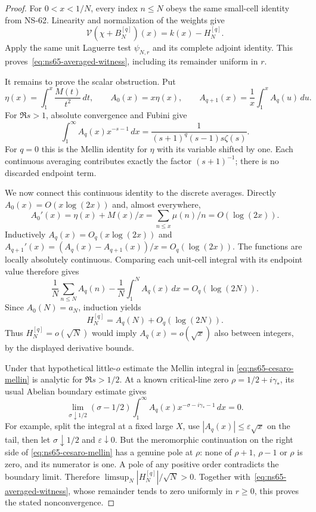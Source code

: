\documentclass[11pt]{article}
\theoremstyle{remark}
\begin{document}
\begin{proof}
For $0<x<1/N$, every index $n\leq N$ obeys the same small-cell
identity from NS-62. Linearity and normalization of the weights give
\[
 \mathcal V(\chi+B_N^{[q]})(x)=k(x)-H_N^{[q]}.
\]
Apply the same unit Laguerre test $\psi_{N,r}$ and its complete
adjoint identity. This proves~\eqref{eq:ns65-averaged-witness},
including its remainder uniform in $r$.

It remains to prove the scalar obstruction. Put
\[
 \eta(x)=\int_1^x\frac{M(t)}{t^2}\,dt,\qquad
 A_0(x)=x\eta(x),\qquad
 A_{q+1}(x)=\frac1x\int_1^x A_q(u)\,du.
\]
For $\Re s>1$, absolute convergence and Fubini give
\begin{equation}
 \int_1^\infty A_q(x)x^{-s-1}\,dx
   =\frac1{(s+1)^q(s-1)s\zeta(s)}.
 \label{eq:ns65-cesaro-mellin}
\end{equation}
For $q=0$ this is the Mellin identity for $\eta$ with its variable
shifted by one. Each continuous averaging contributes exactly the
factor $(s+1)^{-1}$; there is no discarded endpoint term.

We now connect this continuous identity to the discrete averages.
Directly $A_0(x)=O(x\log(2x))$ and, almost everywhere,
\[
 A_0'(x)=\eta(x)+M(x)/x
         =\sum_{n\leq x}\mu(n)/n=O(\log(2x)).
\]
Inductively $A_q(x)=O_q(x\log(2x))$ and
$A_{q+1}'(x)=(A_q(x)-A_{q+1}(x))/x=O_q(\log(2x))$.
The functions are locally absolutely continuous. Comparing each
unit-cell integral with its endpoint value therefore gives
\[
 \frac1N\sum_{n\leq N}A_q(n)-\frac1N\int_1^N A_q(x)\,dx
       =O_q(\log(2N)).
\]
Since $A_0(N)=a_N$, induction yields
\begin{equation}
 H_N^{[q]}=A_q(N)+O_q(\log(2N)).
 \label{eq:ns65-discrete-continuous}
\end{equation}
Thus $H_N^{[q]}=o(\sqrt N)$ would imply $A_q(x)=o(\sqrt x)$
also between integers, by the displayed derivative bounds.

Under that hypothetical little-$o$ estimate the Mellin integral in
\eqref{eq:ns65-cesaro-mellin} is analytic for $\Re s>1/2$.
At a known critical-line zero $\rho=1/2+i\gamma_*$, its usual
Abelian boundary estimate gives
\[
 \lim_{\sigma\downarrow1/2}(\sigma-1/2)
       \int_1^\infty A_q(x)x^{-\sigma-i\gamma_*-1}\,dx=0.
\]
For example, split the integral at a fixed large $X$, use
$|A_q(x)|\leq\varepsilon\sqrt x$ on the tail, then let
$\sigma\downarrow1/2$ and $\varepsilon\downarrow0$.
But the meromorphic continuation on the right side of
\eqref{eq:ns65-cesaro-mellin} has a genuine pole at $\rho$:
none of $\rho+1$, $\rho-1$ or $\rho$ is zero, and its numerator
is one. A pole of any positive order contradicts the boundary limit.
Therefore $\limsup_N|H_N^{[q]}|/\sqrt N>0$.
Together with~\eqref{eq:ns65-averaged-witness}, whose remainder tends
to zero uniformly in $r\geq0$, this proves the stated nonconvergence.
\end{proof}
\end{document}
